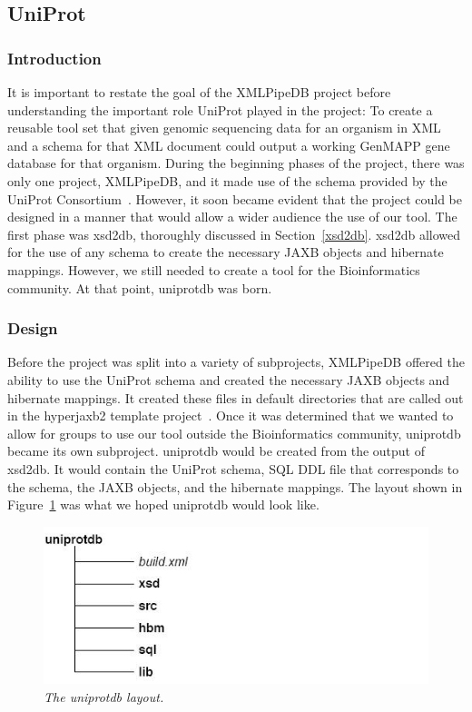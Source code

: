 \subsection{UniProt}
\label{uniprotdb}

\subsubsection{Introduction}
It is important to restate the goal of the XMLPipeDB project before understanding 
the important role UniProt played in the project: To create a reusable tool set 
that given genomic sequencing data for an organism in XML and a schema for that 
XML document could output a working GenMAPP gene database for that organism.  During
the beginning phases of the project, there was only one project, XMLPipeDB, and it
made use of the schema provided by the UniProt Consortium~\cite{uniprotWeb}.  However,
it soon became evident that the project could be designed in a manner that would 
allow a wider audience the use of our tool.  The first phase was xsd2db, thoroughly
discussed in Section~\ref{xsd2db}.  xsd2db allowed for the use of any schema
to create the necessary JAXB objects and hibernate mappings.  However, we still
needed to create a tool for the Bioinformatics community.  At that point, uniprotdb
was born.  

\subsubsection{Design}
Before the project was split into a variety of subprojects, XMLPipeDB offered
the ability to use the UniProt schema and created the necessary JAXB objects
and hibernate mappings.  It created these files in default directories that 
are called out in the hyperjaxb2 template project~\cite{hyperjaxb}.  Once it was
determined that we wanted to allow for groups to use our tool outside the 
Bioinformatics community, uniprotdb became its own subproject.  uniprotdb
would be created from the output of xsd2db.  It would contain the UniProt schema,
SQL DDL file that corresponds to the schema, the JAXB objects, and the hibernate
mappings.  
The layout 
shown in Figure~\ref{fig:uniprotLayout} was what we hoped uniprotdb would look like.  

\begin{figure}[htp]
\centering
\includegraphics[scale=1.0]{Images/uniprotLayout.jpg}
\caption{\small \sl The uniprotdb layout.} 
\label{fig:uniprotLayout}
\end{figure}

